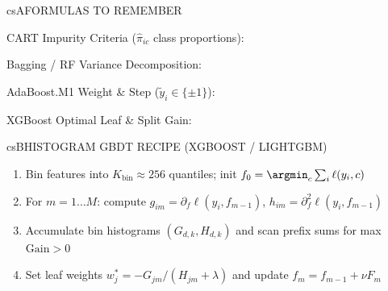 \documentclass[../../../../master.tex]{subfiles}
\begin{document}

\csnextpage

\begin{cscolumns}
\begin{cscard}{csA}{FORMULAS TO REMEMBER}
  \begin{csbul}
    \item CART Impurity Criteria ($\hat\pi_{ic}$ class proportions):
    \item Bagging / RF Variance Decomposition:
    \item AdaBoost.M1 Weight \& Step ($\tilde y_i\in\{\pm 1\}$):
    \item XGBoost Optimal Leaf \& Split Gain:
  \end{csbul}
\end{cscard}

\begin{cscard}{csB}{HISTOGRAM GBDT RECIPE (XGBOOST / LIGHTGBM)}
  \begin{enumerate}[leftmargin=1.2em, itemsep=1pt, topsep=1pt, parsep=0pt]
    \item Bin features into $K_{\mathrm{bin}}\approx 256$ quantiles; init $f_0=\argmin_c\sum_i\ell(y_i,c)$
    \item For $m=1\dots M$: compute $g_{im}=\partial_f\ell(y_i,f_{m-1})$, $h_{im}=\partial_f^2\ell(y_i,f_{m-1})$
    \item Accumulate bin histograms $(G_{d,k},H_{d,k})$ and scan prefix sums for max $\mathrm{Gain}>0$
    \item Set leaf weights $w_j^*=-G_{jm}/(H_{jm}+\lambda)$ and update $f_m=f_{m-1}+\nu F_m$
  \end{enumerate}
\end{cscard}
\columnbreak


\end{cscolumns}
\end{document}
